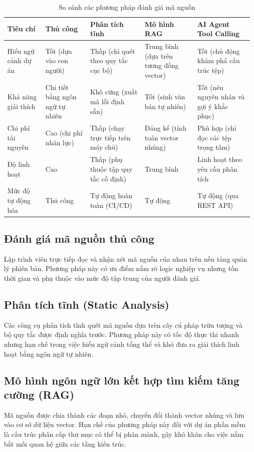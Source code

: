\documentclass[12pt,a4paper]{report}
\begin{document}
\begin{table}[H]
\centering
\caption{So sánh các phương pháp đánh giá mã nguồn}
\label{tab:method_comparison}
\renewcommand{\arraystretch}{1.2}
\begin{tabular}{|p{3.2cm}|p{2.6cm}|p{2.8cm}|p{2.6cm}|p{2.8cm}|}
\hline
\textbf{Tiêu chí} & \textbf{Thủ công} & \textbf{Phân tích tĩnh} & \textbf{Mô hình RAG} & \textbf{AI Agent Tool Calling} \\ \hline
Hiểu ngữ cảnh dự án & Tốt (dựa vào con người) & Thấp (chỉ quét theo quy tắc cục bộ) & Trung bình (dựa trên tương đồng vector) & Tốt (chủ động khám phá cấu trúc tệp) \\ \hline
Khả năng giải thích & Chi tiết bằng ngôn ngữ tự nhiên & Khô cứng (xuất mã lỗi định sẵn) & Tốt (sinh văn bản tự nhiên) & Tốt (nêu nguyên nhân và gợi ý khắc phục) \\ \hline
Chi phí tài nguyên & Cao (chi phí nhân lực) & Thấp (chạy trực tiếp trên máy chủ) & Đáng kể (tính toán vector nhúng) & Phù hợp (chỉ đọc các tệp trọng tâm) \\ \hline
Độ linh hoạt & Cao & Thấp (phụ thuộc tập quy tắc cố định) & Trung bình & Linh hoạt theo yêu cầu phân tích \\ \hline
Mức độ tự động hóa & Thủ công & Tự động hoàn toàn (CI/CD) & Tự động & Tự động (qua REST API) \\ \hline
\end{tabular}
\end{table}

\subsection{Đánh giá mã nguồn thủ công}
Lập trình viên trực tiếp đọc và nhận xét mã nguồn của nhau trên nền tảng quản lý phiên bản. Phương pháp này có ưu điểm nắm rõ logic nghiệp vụ nhưng tốn thời gian và phụ thuộc vào mức độ tập trung của người đánh giá.

\subsection{Phân tích tĩnh (Static Analysis)}
Các công cụ phân tích tĩnh quét mã nguồn dựa trên cây cú pháp trừu tượng và bộ quy tắc được định nghĩa trước. Phương pháp này có tốc độ thực thi nhanh nhưng hạn chế trong việc hiểu ngữ cảnh tổng thể và khó đưa ra giải thích linh hoạt bằng ngôn ngữ tự nhiên.

\subsection{Mô hình ngôn ngữ lớn kết hợp tìm kiếm tăng cường (RAG)}
Mã nguồn được chia thành các đoạn nhỏ, chuyển đổi thành vector nhúng và lưu vào cơ sở dữ liệu vector. Hạn chế của phương pháp này đối với dự án phần mềm là cấu trúc phân cấp thư mục có thể bị phân mảnh, gây khó khăn cho việc nắm bắt mối quan hệ giữa các tầng kiến trúc.
\end{document}
